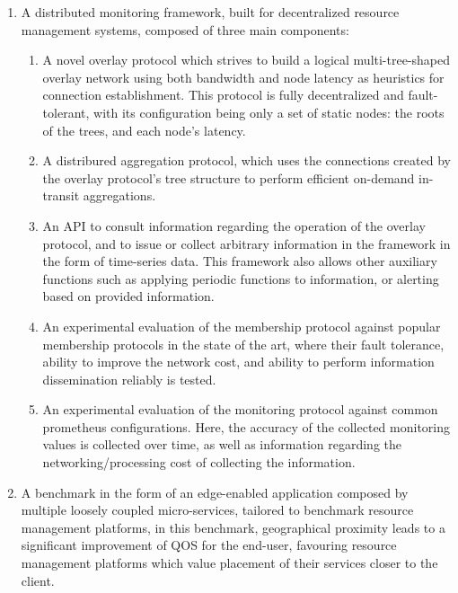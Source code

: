 \begin{enumerate}
    \item A distributed monitoring framework, built for decentralized resource management systems, composed of three main components: {
        \begin{enumerate}
            \item A novel overlay protocol which strives to build a logical multi-tree-shaped overlay network using both bandwidth and node latency as heuristics for connection establishment. This protocol is fully decentralized and fault-tolerant, with its configuration being only a set of static nodes: the roots of the trees, and each node's latency.
            
            \item A distribured aggregation protocol, which uses the connections created by the overlay protocol's tree structure to perform efficient on-demand in-transit aggregations.
            
            \item An API to consult information regarding the operation of the overlay protocol, and to issue or collect arbitrary information in the framework in the form of time-series data. This framework also allows other auxiliary functions such as applying periodic functions to information, or alerting based on provided information. 
            
            \item An experimental evaluation of the membership protocol against popular membership protocols in the state of the art, where their fault tolerance, ability to improve the network cost, and ability to perform information dissemination reliably is tested. 

            \item An experimental evaluation of the monitoring protocol against common prometheus configurations. Here, the accuracy of the collected monitoring values is collected over time, as well as information regarding the networking/processing cost of collecting the information.
            
        \end{enumerate}
        }
    \item A benchmark in the form of an edge-enabled application composed by multiple loosely coupled micro-services, tailored to benchmark resource management platforms, in this benchmark, geographical proximity leads to a significant improvement of QOS for the end-user, favouring resource management platforms which value placement of their services closer to the client.
    
\end{enumerate}

